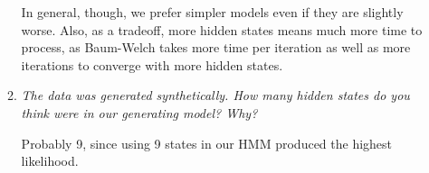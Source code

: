\documentclass{article}
\begin{document}
\begin{enumerate}[(a)]
\begin{enumerate}
    In general, though, we prefer simpler models even if they are
    slightly worse. Also, as a tradeoff, more hidden states means much
    more time to process, as Baum-Welch takes more time per iteration
    as well as more iterations to converge with more hidden states.

  \item \emph{The data was generated synthetically. How many hidden states do you
    think were in our generating model? Why?}

    Probably 9, since using 9 states in our HMM produced the highest likelihood.

  \end{enumerate}
\end{enumerate}
\end{document}

